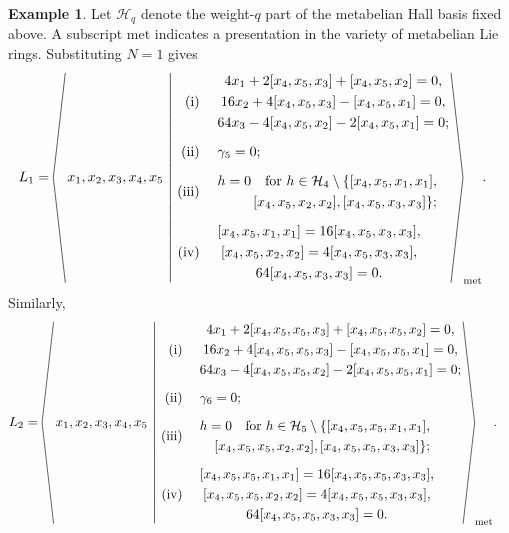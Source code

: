 \documentclass[a4paper,11pt,reqno]{amsart}
\theoremstyle{definition}
\newtheorem{example}[theorem]{Example}
\newcommand{\presentationlangle}{%
  \mathopen{\vcenter{\hbox{%
    \begin{tikzpicture}[x=1ex,y=1ex,baseline=(current bounding box.center)]
      \draw[line width=.45pt] (2,17.5) -- (0,0) -- (2,-17.5);
    \end{tikzpicture}%
  }}}%
}
\newcommand{\presentationrangle}{%
  \mathclose{\vcenter{\hbox{%
    \begin{tikzpicture}[x=1ex,y=1ex,baseline=(current bounding box.center)]
      \draw[line width=.45pt] (0,17.5) -- (2,0) -- (0,-17.5);
    \end{tikzpicture}%
  }}}%
}
\begin{document}
\begin{example}\label{ex:first-two-plateaux}
Let $\mathcal H_q$ denote the weight-$q$ part of the metabelian Hall basis
fixed above.  A subscript $\mathrm{met}$ indicates a presentation in the
variety of metabelian Lie rings.  Substituting $N=1$ gives
\[
\begin{aligned}
L_1={}&
\presentationlangle
\left.
x_1,x_2,x_3,x_4,x_5
\ \middle|\
\begin{aligned}
\text{(i)}\;&\quad
 \begin{gathered}
 4x_1+2[x_4,x_5,x_3]+[x_4,x_5,x_2]=0,\\
 16x_2+4[x_4,x_5,x_3]-[x_4,x_5,x_1]=0,\\
 64x_3-4[x_4,x_5,x_2]-2[x_4,x_5,x_1]=0;
 \end{gathered}\\[5pt]
\text{(ii)}\;&\quad \gamma_5=0;\\[5pt]
\text{(iii)}\;&\quad
 \begin{gathered}
 h=0\quad\text{for }h\in\mathcal H_4\setminus
 \{[x_4,x_5,x_1,x_1],\\
 \hfill [x_4,x_5,x_2,x_2],[x_4,x_5,x_3,x_3]\};
 \end{gathered}\\[5pt]
\text{(iv)}\;&\quad
 \begin{gathered}
 [x_4,x_5,x_1,x_1]=16[x_4,x_5,x_3,x_3],\\
 [x_4,x_5,x_2,x_2]=4[x_4,x_5,x_3,x_3],\\
 64[x_4,x_5,x_3,x_3]=0.
\end{gathered}
\end{aligned}
\right.
\presentationrangle_{\mathrm{met}}.
\end{aligned}
\]
Similarly,
\[
\begin{aligned}
L_2={}&
\presentationlangle
\left.
x_1,x_2,x_3,x_4,x_5
\ \middle|\
\begin{aligned}
\text{(i)}\;&\quad
 \begin{gathered}
 4x_1+2[x_4,x_5,x_5,x_3]+[x_4,x_5,x_5,x_2]=0,\\
 16x_2+4[x_4,x_5,x_5,x_3]-[x_4,x_5,x_5,x_1]=0,\\
 64x_3-4[x_4,x_5,x_5,x_2]-2[x_4,x_5,x_5,x_1]=0;
 \end{gathered}\\[5pt]
\text{(ii)}\;&\quad \gamma_6=0;\\[5pt]
\text{(iii)}\;&\quad
 \begin{gathered}
 h=0\quad\text{for }h\in\mathcal H_5\setminus
 \{[x_4,x_5,x_5,x_1,x_1],\\
 \hfill [x_4,x_5,x_5,x_2,x_2],[x_4,x_5,x_5,x_3,x_3]\};
 \end{gathered}\\[5pt]
\text{(iv)}\;&\quad
 \begin{gathered}
 [x_4,x_5,x_5,x_1,x_1]=16[x_4,x_5,x_5,x_3,x_3],\\
 [x_4,x_5,x_5,x_2,x_2]=4[x_4,x_5,x_5,x_3,x_3],\\
 64[x_4,x_5,x_5,x_3,x_3]=0.
\end{gathered}
\end{aligned}
\right.
\presentationrangle_{\mathrm{met}}.
\end{aligned}
\]
\end{example}
\end{document}
